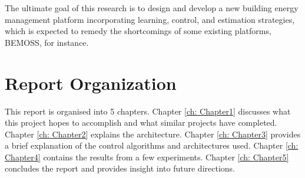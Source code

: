 The ultimate goal of this research is to design and develop a new building energy management
platform incorporating learning, control, and estimation strategies, which is expected to remedy the
shortcomings of some existing platforms, BEMOSS, for instance.

\section{Report Organization}
This report is organised into 5 chapters.  Chapter \ref{ch: Chapter1} discusses
what this project hopes to accomplish and what similar projects have completed.
Chapter \ref{ch: Chapter2} explains the architecture. Chapter \ref{ch: Chapter3}
provides a brief explanation of the control algorithms and architectures used.
Chapter \ref{ch: Chapter4} contains the results from a few experiments. Chapter \ref{ch: Chapter5} concludes the report and provides insight into future directions.

